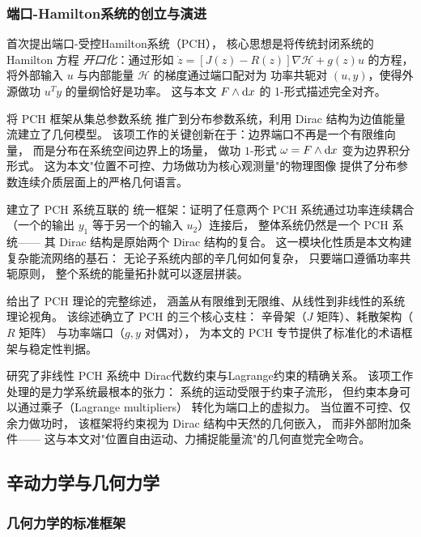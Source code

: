 ﻿\documentclass[10pt,a4paper]{article}
\begin{document}
\subsubsection{端口-Hamilton系统的创立与演进}

\textcite{MaschkeVanDerSchaft1992} 首次提出端口-受控Hamilton系统（PCH），
核心思想是将传统封闭系统的 Hamilton 方程
\emph{开口化}：通过形如 $\dot{z} = [J(z)-R(z)]\nabla\mathcal H + g(z)u$
的方程，将外部输入 $u$ 与内部能量 $\mathcal H$ 的梯度通过端口配对为
功率共轭对 $(u,y)$，使得外源做功 $u^T y$ 的量纲恰好是功率。
这与本文 $F \wedge \text dx$ 的 1-形式描述完全对齐。

\textcite{VanDerSchaftMaschke2002} 将 PCH 框架从集总参数系统
推广到分布参数系统，利用 Dirac 结构为边值能量流建立了几何模型。
该项工作的关键创新在于：边界端口不再是一个有限维向量，
而是分布在系统空间边界上的场量，
做功 $1$-形式 $\omega = F \wedge \text dx$ 变为边界积分形式。
这为本文"位置不可控、力场做功为核心观测量"的物理图像
提供了分布参数连续介质层面上的严格几何语言。

\textcite{CerveraVanDerSchaftBanos2007} 建立了 PCH 系统互联的
统一框架：证明了任意两个 PCH 系统通过功率连续耦合
（一个的输出 $y_1$ 等于另一个的输入 $u_2$）连接后，
整体系统仍然是一个 PCH 系统——
其 Dirac 结构是原始两个 Dirac 结构的复合。
这一模块化性质是本文构建复杂能流网络的基石：
无论子系统内部的辛几何如何复杂，
只要端口遵循功率共轭原则，
整个系统的能量拓扑就可以逐层拼装。

\textcite{VanDerSchaftJeltsema2014} 给出了 PCH 理论的完整综述，
涵盖从有限维到无限维、从线性到非线性的系统理论视角。
该综述确立了 PCH 的三个核心支柱：
辛骨架（$J$ 矩阵）、耗散架构（$R$ 矩阵）
与功率端口（$g, y$ 对偶对），
为本文的 PCH 专节提供了标准化的术语框架与稳定性判据。

\textcite{VanDerSchaftMaschke2020} 研究了非线性 PCH 系统中
Dirac代数约束与Lagrange约束的精确关系。
该项工作处理的是力学系统最根本的张力：
系统的运动受限于约束子流形，
但约束本身可以通过乘子（Lagrange multipliers）
转化为端口上的虚拟力。
当位置不可控、仅余力做功时，
该框架将约束视为 Dirac 结构中天然的几何嵌入，
而非外部附加条件——
这与本文对"位置自由运动、力捕捉能量流"的几何直觉完全吻合。

\subsection{辛动力学与几何力学}

\subsubsection{几何力学的标准框架}
\end{document}
